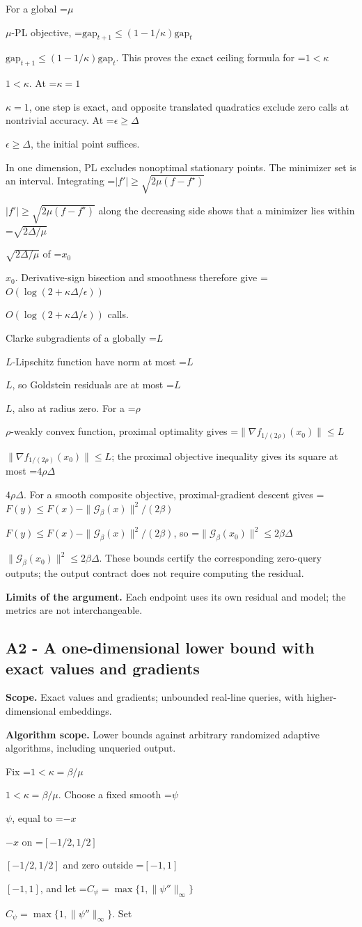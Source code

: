 \documentclass[10pt,a4paper]{article}
\newcommand{\AtlasMath}[1]{\par\begingroup\centering\setbox0=\hbox{$\displaystyle #1$}\ifdim\wd0>1.4\linewidth\typeout{ATLAS WIDE FORMULA: \the\wd0}\fi\ifdim\wd0>\linewidth\resizebox{\linewidth}{!}{\box0}\else\box0\fi\par\endgroup}
\newcommand{\AtlasInlineMath}[1]{\begingroup\setbox0=\hbox{$#1$}\ifdim\wd0>.4\linewidth\endgroup\AtlasMath{#1}\else\endgroup$#1$\fi}
\begin{document}
For a global \AtlasInlineMath{\mu}-PL objective,
\AtlasInlineMath{\mathrm{gap}_{t+1}\le(1-1/\kappa)\mathrm{gap}_t}.
This proves the exact ceiling formula for \AtlasInlineMath{1<\kappa}. At \AtlasInlineMath{\kappa=1}, one step is exact, and opposite translated quadratics exclude zero calls at nontrivial accuracy. At \AtlasInlineMath{\epsilon\ge\Delta}, the initial point suffices.

In one dimension, PL excludes nonoptimal stationary points. The minimizer set is an interval. Integrating
\AtlasInlineMath{|f'|\ge\sqrt{2\mu(f-f^\star)}}
along the decreasing side shows that a minimizer lies within \AtlasInlineMath{\sqrt{2\Delta/\mu}} of \AtlasInlineMath{x_0}. Derivative-sign bisection and smoothness therefore give \AtlasInlineMath{O(\log(2+\kappa\Delta/\epsilon))} calls.

Clarke subgradients of a globally \AtlasInlineMath{L}-Lipschitz function have norm at most \AtlasInlineMath{L}, so Goldstein residuals are at most \AtlasInlineMath{L}, also at radius zero. For a \AtlasInlineMath{\rho}-weakly convex function, proximal optimality gives
\AtlasInlineMath{\|\nabla f_{1/(2\rho)}(x_0)\|\le L}; the proximal objective inequality gives its square at most \AtlasInlineMath{4\rho\Delta}.
For a smooth composite objective, proximal-gradient descent gives
\AtlasInlineMath{F(y)\le F(x)-\|\mathcal G_\beta(x)\|^2/(2\beta)},
so \AtlasInlineMath{\|\mathcal G_\beta(x_0)\|^2\le2\beta\Delta}.
These bounds certify the corresponding zero-query outputs; the output contract does not require computing the residual.

\textbf{Limits of the argument.} Each endpoint uses its own residual and model; the metrics are not interchangeable.

\subsection{A2 - A one-dimensional lower bound with exact values and gradients}
\textbf{Scope.} Exact values and gradients; unbounded real-line queries, with higher-dimensional embeddings.

\textbf{Algorithm scope.} Lower bounds against arbitrary randomized adaptive algorithms, including unqueried output.

Fix \AtlasInlineMath{1<\kappa=\beta/\mu}. Choose a fixed smooth \AtlasInlineMath{\psi}, equal to \AtlasInlineMath{-x} on \AtlasInlineMath{[-1/2,1/2]} and zero outside \AtlasInlineMath{[-1,1]}, and let \AtlasInlineMath{C_\psi=\max\{1,\|\psi''\|_\infty\}}. Set
\end{document}
